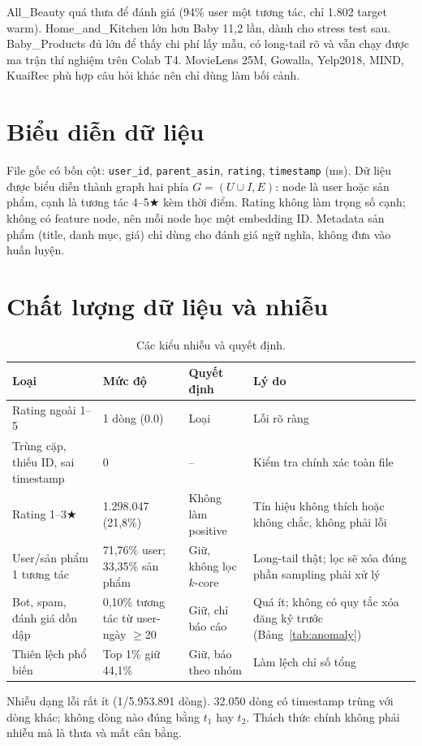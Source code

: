 \documentclass[11pt,a4paper,oneside]{report}
\newcommand{\rstar}{\ensuremath{\bigstar}}
\begin{document}
All\_Beauty quá thưa để đánh giá (94\% user một tương tác, chỉ 1.802 target warm). Home\_and\_Kitchen lớn hơn Baby 11,2 lần, dành cho stress test sau. Baby\_Products đủ lớn để thấy chi phí lấy mẫu, có long-tail rõ và vẫn chạy được ma trận thí nghiệm trên Colab T4. MovieLens 25M, Gowalla, Yelp2018, MIND, KuaiRec phù hợp câu hỏi khác nên chỉ dùng làm bối cảnh.

\section{Biểu diễn dữ liệu}
File gốc có bốn cột: \texttt{user\_id}, \texttt{parent\_asin}, \texttt{rating}, \texttt{timestamp} (ms). Dữ liệu được biểu diễn thành graph hai phía $G=(U\cup I, E)$: node là user hoặc sản phẩm, cạnh là tương tác 4--5\rstar{} kèm thời điểm. Rating không làm trọng số cạnh; không có feature node, nên mỗi node học một embedding ID. Metadata sản phẩm (title, danh mục, giá) chỉ dùng cho đánh giá ngữ nghĩa, không đưa vào huấn luyện.

\section{Chất lượng dữ liệu và nhiễu}\label{sec:noise}
\begin{table}[h]
\centering\small
\caption{Các kiểu nhiễu và quyết định.}\label{tab:noise}
\begin{tabularx}{\linewidth}{p{3.3cm}p{3.2cm}p{2.9cm}Y}
\toprule
Loại & Mức độ & Quyết định & Lý do \\
\midrule
Rating ngoài 1--5 & 1 dòng (0.0) & Loại & Lỗi rõ ràng \\
Trùng cặp, thiếu ID, sai timestamp & 0 & -- & Kiểm tra chính xác toàn file \\
Rating 1--3\rstar{} & 1.298.047 (21,8\%) & Không làm positive & Tín hiệu không thích hoặc không chắc, không phải lỗi \\
User/sản phẩm 1 tương tác & 71,76\% user; 33,35\% sản phẩm & Giữ, không lọc $k$-core & Long-tail thật; lọc sẽ xóa đúng phần sampling phải xử lý \\
Bot, spam, đánh giá dồn dập & 0,10\% tương tác từ user-ngày $\ge$20 & Giữ, chỉ báo cáo & Quá ít; không có quy tắc xóa đăng ký trước (Bảng~\ref{tab:anomaly}) \\
Thiên lệch phổ biến & Top 1\% giữ 44,1\% & Giữ, báo theo nhóm & Làm lệch chỉ số tổng \\
\bottomrule
\end{tabularx}
\end{table}
Nhiễu dạng lỗi rất ít (1/5.953.891 dòng). 32.050 dòng có timestamp trùng với dòng khác; không dòng nào đúng bằng $t_1$ hay $t_2$. Thách thức chính không phải nhiễu mà là thưa và mất cân bằng.
\end{document}
